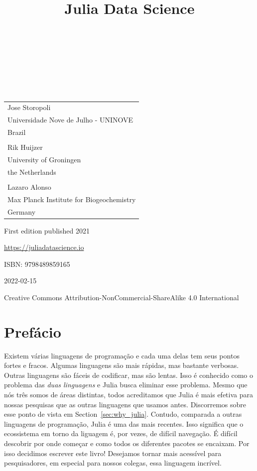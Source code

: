 \documentclass[
  notoc %
]{tufte-book}
\title{Julia Data Science}
\author{\noindent{Jose Storopoli}\\[3mm] \noindent{Rik
Huijzer}\\[3mm] \noindent{Lazaro Alonso}\\[3mm] }
\date{}
\begin{document}
\makeatletter
\thispagestyle{empty}
\vfill
{\Huge\bf
\noindent
\@title
}\\[1in]
{\Large
\noindent
\@author
}
\makeatother

\makeatletter
\newpage
\thispagestyle{empty}
\vfill
{\noindent
\begin{tabular}{l} Jose Storopoli\\ Universidade Nove de Julho - UNINOVE\\ Brazil\\ \\ Rik Huijzer\\ University of Groningen\\ the Netherlands\\ \\ Lazaro Alonso\\ Max Planck Institute for Biogeochemistry\\ Germany \end{tabular}
}
\vfill
{\small
First edition published 2021

\url{https://juliadatascience.io}

ISBN: 9798489859165

2022-02-15

Creative Commons Attribution-NonCommercial-ShareAlike 4.0 International
}
\makeatother


\frontmatter
\mainmatter

\setcounter{tocdepth}{1}
\tableofcontents

\justifying

\setlength{\parindent}{0pt}

\hypertarget{sec:preface}{%
\chapter{Prefácio}\label{sec:preface}}

Existem várias linguagens de programação e cada uma delas tem seus
pontos fortes e fracos. Algumas linguagens são mais rápidas, mas
bastante verbosas. Outras linguagens são fáceis de codificar, mas são
lentas. Isso é conhecido como o problema das \emph{duas linguagens} e
Julia busca eliminar esse problema. Mesmo que nós três somos de áreas
distintas, todos acreditamos que Julia é mais efetiva para nossas
pesquisas que as outras linguagens que usamos antes. Discorremos sobre
esse ponto de vista em Section~\ref{sec:why_julia}. Contudo, comparada a
outras linguagens de programação, Julia é uma das mais recentes. Isso
significa que o ecossistema em torno da liguagem é, por vezes, de
difícil navegação. É difícil descobrir por onde começar e como todos os
diferentes pacotes se encaixam. Por isso decidimos escrever este livro!
Desejamos tornar mais acessível para pesquisadores, em especial para
nossos colegas, essa linguagem incrível.
\end{document}
